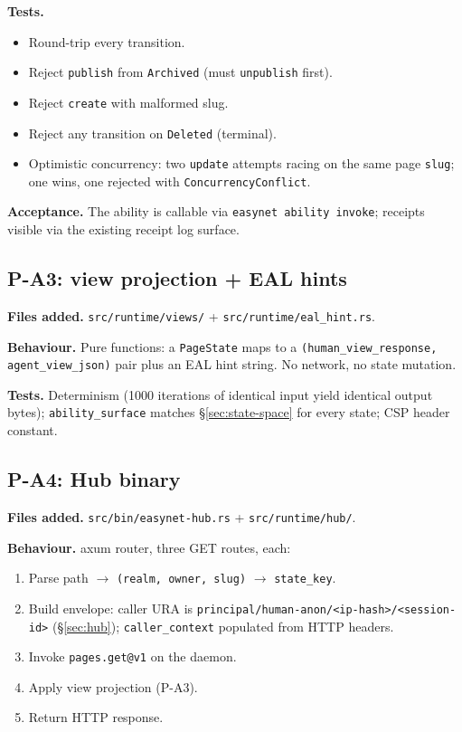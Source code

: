 \documentclass[11pt,a4paper]{article}
\theoremstyle{definition}
\begin{document}
\textbf{Tests.}
\begin{itemize}[leftmargin=2.2em,itemsep=0.1em]
    \item Round-trip every transition.
    \item Reject \texttt{publish} from \texttt{Archived} (must
    \texttt{unpublish} first).
    \item Reject \texttt{create} with malformed slug.
    \item Reject any transition on \texttt{Deleted} (terminal).
    \item Optimistic concurrency: two \texttt{update} attempts
    racing on the same page \texttt{slug}; one wins, one rejected
    with \texttt{ConcurrencyConflict}.
\end{itemize}

\textbf{Acceptance.} The ability is callable via
\texttt{easynet ability invoke}; receipts visible via the
existing receipt log surface.

\subsection{P-A3: view projection + EAL hints}

\textbf{Files added.} \texttt{src/runtime/views/} +
\texttt{src/runtime/eal\_hint.rs}.

\textbf{Behaviour.} Pure functions: a \texttt{PageState} maps to
a \texttt{(human\_view\_response, agent\_view\_json)} pair plus
an EAL hint string. No network, no state mutation.

\textbf{Tests.} Determinism (1000 iterations of identical input
yield identical output bytes); \texttt{ability\_surface} matches
\S\ref{sec:state-space} for every state; CSP header constant.

\subsection{P-A4: Hub binary}

\textbf{Files added.} \texttt{src/bin/easynet-hub.rs} +
\texttt{src/runtime/hub/}.

\textbf{Behaviour.} axum router, three GET routes, each:
\begin{enumerate}[leftmargin=2.2em,itemsep=0.1em]
    \item Parse path $\to$ \texttt{(realm, owner, slug)} $\to$
    \texttt{state\_key}.
    \item Build envelope: caller URA is
    \texttt{principal/human-anon/<ip-hash>/<session-id>}
    (\S\ref{sec:hub}); \texttt{caller\_context} populated from
    HTTP headers.
    \item Invoke \texttt{pages.get@v1} on the daemon.
    \item Apply view projection (P-A3).
    \item Return HTTP response.
\end{enumerate}
\end{document}
